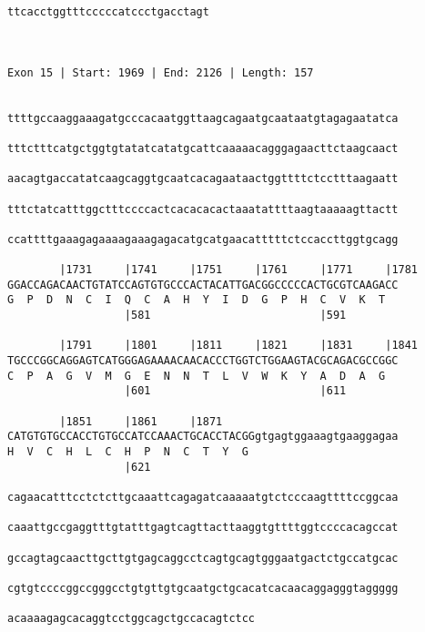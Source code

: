 \documentclass{article}
\begin{document}
\begin{Verbatim}
ttcacctggtttcccccatccctgacctagt
                               
                               
 
Exon 15 | Start: 1969 | End: 2126 | Length: 157


ttttgccaaggaaagatgcccacaatggttaagcagaatgcaataatgtagagaatatca
                                                            
tttctttcatgctggtgtatatcatatgcattcaaaaacagggagaacttctaagcaact
                                                            
aacagtgaccatatcaagcaggtgcaatcacagaataactggttttctcctttaagaatt
                                                            
tttctatcatttggctttccccactcacacacactaaatattttaagtaaaaagttactt
                                                            
ccattttgaaagagaaaagaaagagacatgcatgaacatttttctccaccttggtgcagg
                                                            
        |1731     |1741     |1751     |1761     |1771     |1781
GGACCAGACAACTGTATCCAGTGTGCCCACTACATTGACGGCCCCCACTGCGTCAAGACC
G  P  D  N  C  I  Q  C  A  H  Y  I  D  G  P  H  C  V  K  T  
                  |581                          |591        
  
        |1791     |1801     |1811     |1821     |1831     |1841
TGCCCGGCAGGAGTCATGGGAGAAAACAACACCCTGGTCTGGAAGTACGCAGACGCCGGC
C  P  A  G  V  M  G  E  N  N  T  L  V  W  K  Y  A  D  A  G  
                  |601                          |611        
  
        |1851     |1861     |1871                           
CATGTGTGCCACCTGTGCCATCCAAACTGCACCTACGGgtgagtggaaagtgaaggagaa
H  V  C  H  L  C  H  P  N  C  T  Y  G                       
                  |621                                      
  
cagaacatttcctctcttgcaaattcagagatcaaaaatgtctcccaagttttccggcaa
                                                            
caaattgccgaggtttgtatttgagtcagttacttaaggtgttttggtccccacagccat
                                                            
gccagtagcaacttgcttgtgagcaggcctcagtgcagtgggaatgactctgccatgcac
                                                            
cgtgtccccggccgggcctgtgttgtgcaatgctgcacatcacaacaggagggtaggggg
                                                            
acaaaagagcacaggtcctggcagctgccacagtctcc
                                      

\end{Verbatim}
\end{document}
